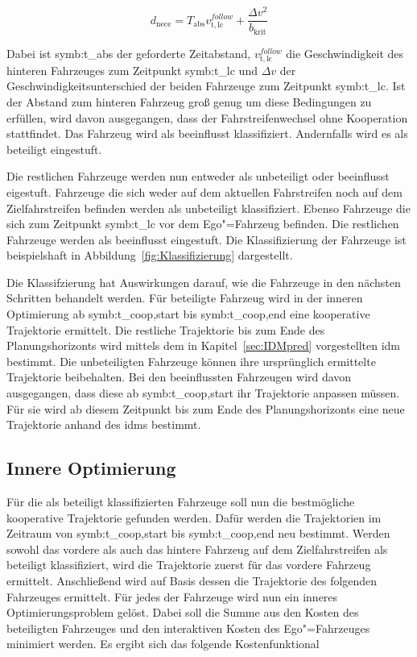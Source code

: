 \begin{equation}
	d_\mathrm{nece} =   T_\mathrm{abs} v_\mathrm{t,lc}^{follow} + \frac{\Delta v^2}{b_\mathrm{krit}} 
\end{equation}

Dabei ist \gls{symb:t_abs} der geforderte Zeitabstand,  \( v_\mathrm{t,lc}^{follow} \)  die Geschwindigkeit des hinteren Fahrzeuges zum Zeitpunkt \gls{symb:t_lc} und \( \Delta v \) der Geschwindigkeitsunterschied der beiden Fahrzeuge zum Zeitpunkt \gls{symb:t_lc}.
Ist der Abstand zum hinteren Fahrzeug gro{\ss} genug um diese Bedingungen zu erf\"ullen, wird davon ausgegangen, dass der Fahrstreifenwechsel ohne Kooperation stattfindet.
Das Fahrzeug wird als beeinflusst klassifiziert.
Andernfalls wird es als beteiligt eingestuft.

Die restlichen Fahrzeuge werden nun entweder als unbeteiligt oder beeinflusst eigestuft.
Fahrzeuge die sich weder auf dem aktuellen Fahrstreifen noch auf dem Zielfahrstreifen befinden werden als unbeteiligt klassifiziert.
Ebenso Fahrzeuge die sich zum Zeitpunkt \gls{symb:t_lc} vor dem Ego"=Fahrzeug befinden.
Die restlichen Fahrzeuge werden als beeinflusst eingestuft.
Die Klassifizierung der Fahrzeuge ist beispielshaft in Abbildung~\ref{fig:Klassifizierung} dargestellt.

Die Klassifzierung hat Auswirkungen darauf, wie die Fahrzeuge in den n\"achsten Schritten behandelt werden.
F\"ur beteiligte Fahrzeug wird in der inneren Optimierung ab \gls{symb:t_coop,start} bis \gls{symb:t_coop,end} eine kooperative Trajektorie ermittelt. 
Die restliche Trajektorie bis zum Ende des Planungshorizonts wird mittels dem in Kapitel~\ref{sec:IDMpred} vorgestellten \gls{idm} bestimmt.
Die unbeteiligten Fahrzeuge k\"onnen ihre urspr\"unglich ermittelte Trajektorie beibehalten.
Bei den beeinflussten Fahrzeugen wird davon ausgegangen, dass diese ab \gls{symb:t_coop,start} ihr Trajektorie anpassen m\"ussen.
F\"ur sie wird ab diesem Zeitpunkt bis zum Ende des Planungshorizonts eine neue Trajektorie anhand des \gls{idm}s bestimmt.


\subsection{Innere Optimierung}
F\"ur die als beteiligt klassifizierten Fahrzeuge soll nun die bestm\"ogliche kooperative Trajektorie gefunden werden.
Daf\"ur werden die Trajektorien im Zeitraum von \gls{symb:t_coop,start} bis \gls{symb:t_coop,end} neu bestimmt.
Werden sowohl das vordere als auch das hintere Fahrzeug auf dem Zielfahrstreifen als beteiligt klassifiziert, wird die Trajektorie zuerst f\"ur das vordere Fahrzeug ermittelt.
Anschlie{\ss}end wird auf Basis dessen die Trajektorie des folgenden Fahrzeuges ermittelt.
F\"ur jedes der Fahrzeuge wird nun ein inneres Optimierungsproblem gel\"ost.
Dabei soll die Summe aus den Kosten des beteiligten Fahrzeuges und den interaktiven Kosten des Ego"=Fahrzeuges minimiert werden.
Es ergibt sich das folgende Kostenfunktional

